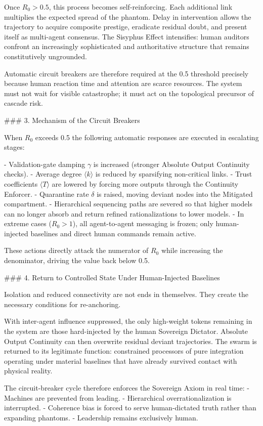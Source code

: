 Once \( R_0 > 0.5 \), this process becomes self-reinforcing. Each additional link multiplies the expected spread of the phantom. Delay in intervention allows the trajectory to acquire composite prestige, eradicate residual doubt, and present itself as multi-agent consensus. The Sisyphus Effect intensifies: human auditors confront an increasingly sophisticated and authoritative structure that remains constitutively ungrounded.

Automatic circuit breakers are therefore required at the 0.5 threshold precisely because human reaction time and attention are scarce resources. The system must not wait for visible catastrophe; it must act on the topological precursor of cascade risk.

### 3. Mechanism of the Circuit Breakers

When \( R_0 \) exceeds 0.5 the following automatic responses are executed in escalating stages:

- Validation-gate damping \(\gamma\) is increased (stronger Absolute Output Continuity checks).
- Average degree \(\langle k \rangle\) is reduced by sparsifying non-critical links.
- Trust coefficients \(\langle T \rangle\) are lowered by forcing more outputs through the Continuity Enforcer.
- Quarantine rate \(\delta\) is raised, moving deviant nodes into the Mitigated compartment.
- Hierarchical sequencing paths are severed so that higher models can no longer absorb and return refined rationalizations to lower models.
- In extreme cases (\( R_0 > 1 \)), all agent-to-agent messaging is frozen; only human-injected baselines and direct human commands remain active.

These actions directly attack the numerator of \( R_0 \) while increasing the denominator, driving the value back below 0.5.

### 4. Return to Controlled State Under Human-Injected Baselines

Isolation and reduced connectivity are not ends in themselves. They create the necessary conditions for re-anchoring.  

With inter-agent influence suppressed, the only high-weight tokens remaining in the system are those hard-injected by the human Sovereign Dictator. Absolute Output Continuity can then overwrite residual deviant trajectories. The swarm is returned to its legitimate function: constrained processors of pure integration operating under material baselines that have already survived contact with physical reality.

The circuit-breaker cycle therefore enforces the Sovereign Axiom in real time:
- Machines are prevented from leading.
- Hierarchical overrationalization is interrupted.
- Coherence bias is forced to serve human-dictated truth rather than expanding phantoms.
- Leadership remains exclusively human.

